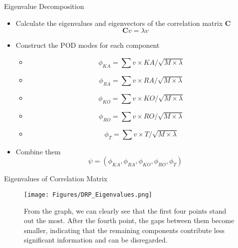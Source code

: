 \documentclass[9pt,xcolor=dvipsnames]{beamer}
\begin{document}
\begin{frame}{Eigenvalue Decomposition}
\begin{itemize}
    \item Calculate the eigenvalues and eigenvectors of the correlation matrix $\textbf{C}$
    \begin{equation*}
        \textbf{C} v = \lambda v 
    \end{equation*}
    \item Construct the POD modes for each component 
    \begin{itemize}
     \item \begin{equation*}
        \phi_{KA} = \sum v \times KA/ \sqrt{M \times \lambda}
    \end{equation*}
     \item \begin{equation*}
        \phi_{RA} = \sum v \times  RA / \sqrt{M \times \lambda}
    \end{equation*}
     \item \begin{equation*}
        \phi_{KO} = \sum v \times KO/ \sqrt{M \times \lambda}
    \end{equation*}
     \item \begin{equation*}
        \phi_{RO} = \sum v \times RO / \sqrt{M \times \lambda}
    \end{equation*}
        \item \begin{equation*}
        \phi_T = \sum v \times T/ \sqrt{M \times \lambda}
    \end{equation*}
    \end{itemize}
    \item Combine them
    \begin{equation*}
        \psi = (\phi_{KA}, \phi_{RA}, \phi_{KO}, \phi_{RO}, \phi_{T})
    \end{equation*}
    \end{itemize}
\end{frame}

\begin{frame}{Eigenvalues of Correlation Matrix}
    \begin{figure} 
        \centering
        \texttt{[image: Figures/DRP\_Eigenvalues.png]} \hspace{1pt}
\caption{From the graph, we can clearly see that the first four points stand out the most. After the fourth point, the gaps between them become smaller, indicating that the remaining components contribute less significant information and can be disregarded.}
\end{figure}  
\end{frame}
\end{document}
